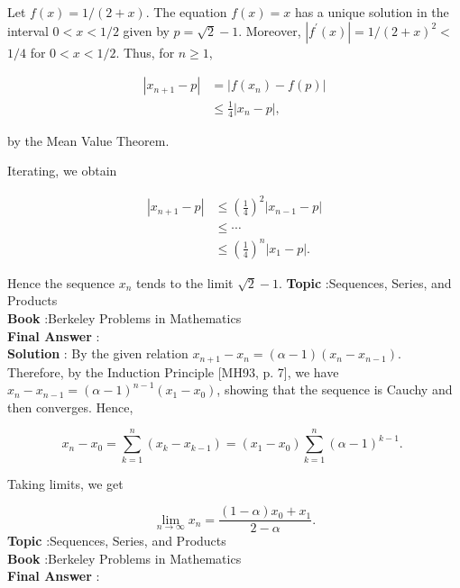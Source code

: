 \documentclass[10pt]{article}
\begin{document}
Let $f(x)=1 /(2+x)$. The equation $f(x)=x$ has a unique solution in the interval $0<x<1 / 2$ given by $p=\sqrt{2}-1$. Moreover, $\left|f^{\prime}(x)\right|=1 /(2+x)^{2}<$ $1 / 4$ for $0<x<1 / 2$. Thus, for $n \geqslant 1$,

$$
\begin{aligned}
\left|x_{n+1}-p\right| &=\left|f\left(x_{n}\right)-f(p)\right| \\
& \leqslant \frac{1}{4}\left|x_{n}-p\right|,
\end{aligned}
$$

by the Mean Value Theorem.

Iterating, we obtain

$$
\begin{aligned}
\left|x_{n+1}-p\right| & \leqslant\left(\frac{1}{4}\right)^{2}\left|x_{n-1}-p\right| \\
& \leqslant \cdots \\
& \leqslant\left(\frac{1}{4}\right)^{n}\left|x_{1}-p\right| .
\end{aligned}
$$

Hence the sequence $x_{n}$ tends to the limit $\sqrt{2}-1$.
\textbf{Topic} :Sequences, Series, and Products \\
\textbf{Book} :Berkeley Problems in Mathematics\\
\textbf{Final Answer} :\\


\textbf{Solution} : By the given relation $x_{n+1}-x_{n}=(\alpha-1)\left(x_{n}-x_{n-1}\right)$. Therefore, by the Induction Principle [MH93, p. 7], we have $x_{n}-x_{n-1}=(\alpha-1)^{n-1}\left(x_{1}-x_{0}\right)$, showing that the sequence is Cauchy and then converges. Hence,

$$
x_{n}-x_{0}=\sum_{k=1}^{n}\left(x_{k}-x_{k-1}\right)=\left(x_{1}-x_{0}\right) \sum_{k=1}^{n}(\alpha-1)^{k-1} \text {. }
$$

Taking limits, we get

$$
\lim _{n \rightarrow \infty} x_{n}=\frac{(1-\alpha) x_{0}+x_{1}}{2-\alpha} .
$$
\textbf{Topic} :Sequences, Series, and Products \\
\textbf{Book} :Berkeley Problems in Mathematics\\
\textbf{Final Answer} :\\
\end{document}
